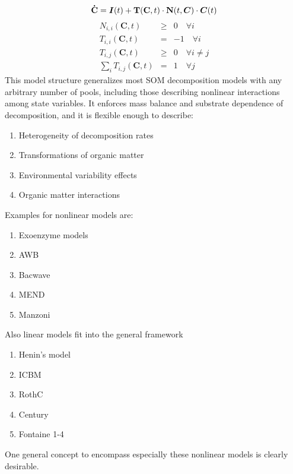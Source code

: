 
\centering
\begin{multicols}{2}
    		\[
		\mathbf{\dot{C}}= \bm{I}(t) + {\bf T}(\mathbf{C},t) \cdot {\bf N}(t, \bm{C}) \cdot \bm{C}(t)
    		\]
    		\begin{equation*}	
    		\label{structCond}
    		\begin{array}{lcl}	
    		N_{i,i}(\mathbf{C},t) 		&\ge& 	 0 \quad \forall i \\
    		T_{i,i}(\mathbf{C},t) 		&=& 	 -1 \quad \forall i \\
    		T_{i,j}(\mathbf{C},t) 		&\ge& 	 0 \quad \forall i \ne j \\
    		\sum_i T_{i,j}(\mathbf{C},t) 	&=  &	 1\quad \forall j 
    		\end{array}	
    		\end{equation*}	
    		This model structure generalizes most SOM decomposition models with any arbitrary number of pools, including those describing nonlinear interactions among state variables. It enforces mass balance and substrate dependence of decomposition, and it is flexible enough to describe:
		\begin{enumerate}
		\item Heterogeneity of decomposition rates
		\item Transformations of organic matter
		\item Environmental variability effects
		\item Organic matter interactions
		\end{enumerate}

		Examples for nonlinear models are:
		\begin{enumerate}
			\item Exoenzyme models \citep{Schimel,Sinsabaugh}
			\item AWB \citep{Allison}
			\item Bacwave \citep{Zelenev}
			\item MEND \citep{WangMEND}
			\item Manzoni \citep{Manzoni07}
		\end{enumerate}
		Also linear models fit into the general framework 
		\begin{enumerate}
			\item Henin's model \citep{HeninDupuis, Henin}
			\item ICBM \citep{AndrenKatterer}
			\item RothC \citep{Jenkinson, Coleman} 
			\item Century \citep{Parton} 
			\item Fontaine 1-4 \citep{Fontaine}
		\end{enumerate}
\end{multicols}
One general concept to encompass especially  these nonlinear  models is clearly desirable.
